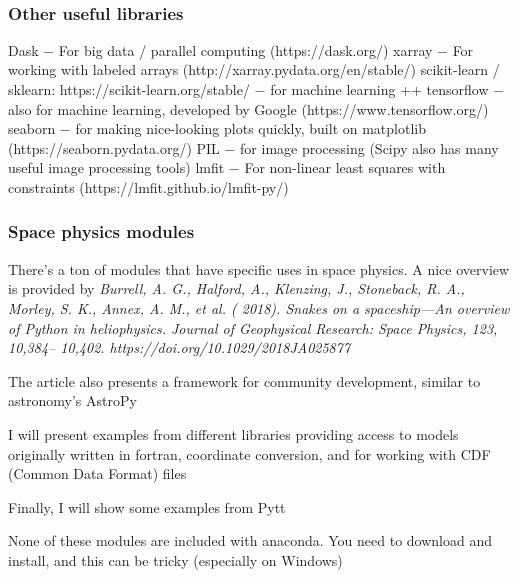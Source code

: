 \documentclass[11pt]{article}
\begin{document}
    \begin{center}
    \end{center}
    { \hspace*{\fill} \\}
    
    \hypertarget{other-useful-libraries}{%
\subsubsection{Other useful libraries}\label{other-useful-libraries}}

Dask \(-\) For big data / parallel computing (https://dask.org/) xarray
\(-\) For working with labeled arrays
(http://xarray.pydata.org/en/stable/) scikit-learn / sklearn:
https://scikit-learn.org/stable/ \(-\) for machine learning ++
tensorflow \(-\) also for machine learning, developed by Google
(https://www.tensorflow.org/) seaborn \(-\) for making nice-looking
plots quickly, built on matplotlib (https://seaborn.pydata.org/) PIL
\(-\) for image processing (Scipy also has many useful image processing
tools) lmfit \(-\) For non-linear least squares with constraints
(https://lmfit.github.io/lmfit-py/)

    \hypertarget{space-physics-modules}{%
\subsubsection{Space physics modules }\label{space-physics-modules}}

There's a ton of modules that have specific uses in space physics. A
nice overview is provided by \emph{Burrell, A. G., Halford, A.,
Klenzing, J., Stoneback, R. A., Morley, S. K., Annex, A. M., et al. (
2018). Snakes on a spaceship---An overview of Python in heliophysics.
Journal of Geophysical Research: Space Physics, 123, 10,384-- 10,402.
https://doi.org/10.1029/2018JA025877}

The article also presents a framework for community development, similar
to astronomy's AstroPy

I will present examples from different libraries providing access to
models originally written in fortran, coordinate conversion, and for
working with CDF (Common Data Format) files

Finally, I will show some examples from Pytt

None of these modules are included with anaconda. You need to download
and install, and this can be tricky (especially on Windows)
\end{document}
